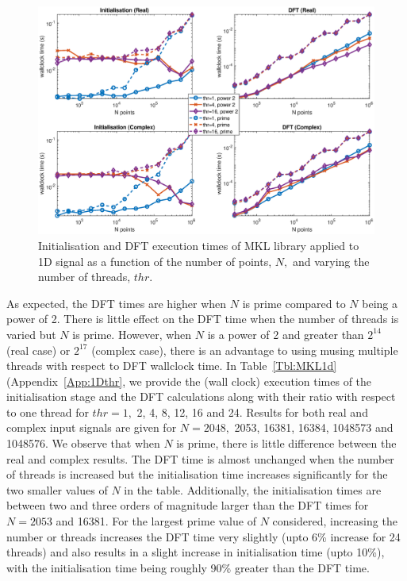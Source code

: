 \documentclass[a4paper]{article}
\begin{document}
\begin{figure}[!htb]
    \centering
    \includegraphics[width=0.9\linewidth]{../results/mkl_1d_thr.eps}
  \caption{Initialisation and DFT execution times of MKL library applied to 1D signal as a function of the
    number of points, $N,$ and varying the number of threads, $thr.$ }
  \label{1DMKL}
\end{figure}

As expected, the DFT times are higher when $N$ is prime compared to
$N$ being a power of 2. There is little effect on the DFT time when
the number of threads is varied but $N$ is prime. However, when $N$ is
a power of 2 and greater than $2^{14}$ (real case) or $2^{17}$
(complex case), there is an advantage to using musing multiple threads
with respect to DFT wallclock time. In Table~\ref{Tbl:MKL1d}
(Appendix~\ref{App:1Dthr}, we provide the (wall clock) execution times
of the initialisation stage and the DFT calculations along with their
ratio with respect to one thread for $thr=1,$ 2, 4, 8, 12, 16 and
24. Results for both real and complex input signals are given for
$N=2048,$ 2053, 16381, 16384, 1048573 and 1048576. We observe that
when $N$ is prime, there is little difference between the real and
complex results. The DFT time is almost unchanged when the number of
threads is increased but the initialisation time increases
significantly for the two smaller values of $N$ in the
table. Additionally, the initialisation times are between two and
three orders of magnitude larger than the DFT times for $N=2053$ and
16381. For the largest prime value of $N$ considered, increasing the
number or threads increases the DFT time very slightly (upto 6\%
increase for 24 threads) and also results in a slight increase in
initialisation time (upto 10\%), with the initialisation time being
roughly 90\% greater than the DFT time.
\end{document}
